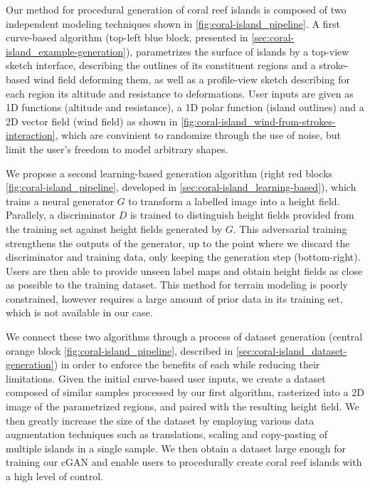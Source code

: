 Our method for procedural generation of coral reef islands is composed of two independent modeling techniques shown in \cref{fig:coral-island_pipeline}. A first curve-based algorithm  (top-left blue block, presented in \cref{sec:coral-island_example-generation}), parametrizes the surface of islands by a top-view sketch interface, describing the outlines of its constituent regions and a stroke-based wind field deforming them, as well as a profile-view sketch describing for each region its altitude and resistance to deformations. User inputs are given as 1D functions (altitude and resistance), a 1D polar function (island outlines) and a 2D vector field (wind field) as shown in \cref{fig:coral-island_wind-from-strokes-interaction}, which are convinient to randomize through the use of noise, but limit the user's freedom to model arbitrary shapes.

We propose a second learning-based generation algorithm (right red blocks \cref{fig:coral-island_pipeline}, developed in \cref{sec:coral-island_learning-based}), which trains a neural generator $G$ to transform a labelled image into a height field. Parallely, a discriminator $D$ is trained to distinguish height fields provided from the training set against height fields generated by $G$. This adversarial training strengthens the outputs of the generator, up to the point where we discard the discriminator and training data, only keeping the generation step (bottom-right). Users are then able to provide unseen label maps and obtain height fields as close as possible to the training dataset. This method for terrain modeling is poorly constrained, however requires a large amount of prior data in its training set, which is not available in our case.

We connect these two algorithms through a process of dataset generation (central orange block \cref{fig:coral-island_pipeline}, described in \cref{sec:coral-island_dataset-generation}) in order to enforce the benefits of each while reducing their limitations. Given the initial curve-based user inputs, we create a dataset composed of similar samples processed by our first algorithm, rasterized into a 2D image of the parametrized regions, and paired with the resulting height field. We then greatly increase the size of the dataset by employing various data augmentation techniques such as translations, scaling and copy-pasting of multiple islands in a single sample. We then obtain a dataset large enough for training our cGAN and enable users to procedurally create coral reef islands with a high level of control.



